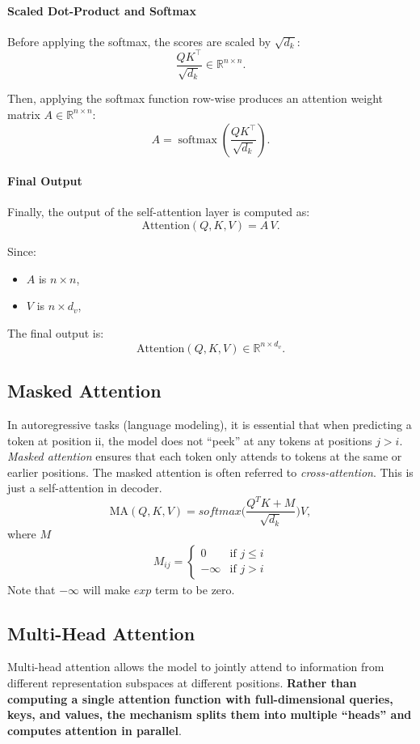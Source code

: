    \paragraph{Scaled Dot-Product and Softmax}

   Before applying the softmax, the scores are scaled by \( \sqrt{d_k} \):
   \[
   \frac{QK^\top}{\sqrt{d_k}} \in \mathbb{R}^{n \times n}.
   \]
   
   Then, applying the softmax function row-wise produces an attention weight matrix \( A \in \mathbb{R}^{n \times n} \):
   \[
   A = \operatorname{softmax}\!\left(\frac{QK^\top}{\sqrt{d_k}}\right).
   \]

   \paragraph{Final Output}
   Finally, the output of the self-attention layer is computed as:
   \[
   \text{Attention}(Q, K, V) = A\,V.
   \]
   
   Since:
   \begin{itemize}
	   \item \( A \) is \( n \times n \),
	   \item \( V \) is \( n \times d_v \),
   \end{itemize}
   
   The final output is:
   \[
   \text{Attention}(Q, K, V) \in \mathbb{R}^{n \times d_v}.
   \]

\subsection{Masked Attention}
In autoregressive tasks (\eg language modeling), it is essential that when predicting a token at position ii, the model does not ``peek'' at any tokens at positions $j>i$. \textit{Masked attention} ensures that each token only attends to tokens at the same or earlier positions. The masked attention is often referred to \textit{cross-attention}. This is just a self-attention in decoder.
$$\textrm{MA}(Q,K,V) = softmax\bigg(\frac{Q^TK+M}{\sqrt{d_k}}\bigg)V,$$
where $M$ 
\begin{align*}
	M_{ij} = \begin{cases}
		0&\text{if } j\leq i\\
		-\infty&\text{if } j>i
	\end{cases}
\end{align*}
Note that $-\infty$ will make $exp$ term to be zero.

\subsection{Multi-Head Attention}
Multi-head attention allows the model to jointly attend to information from different representation subspaces at different positions. \textbf{Rather than computing a single attention function with full-dimensional queries, keys, and values, the mechanism splits them into multiple ``heads'' and computes attention in parallel}. 

